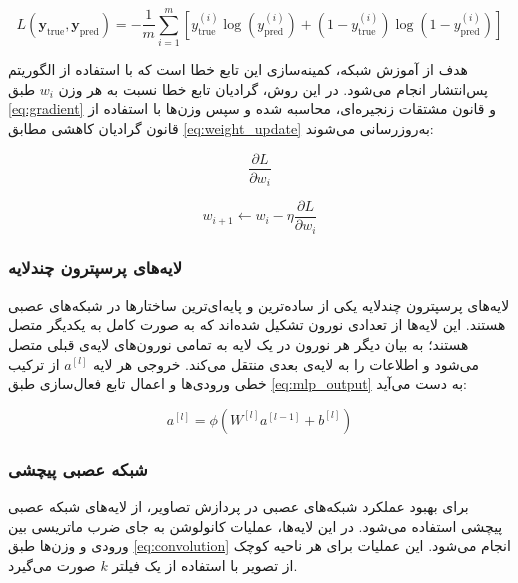 \begin{latin}
\begin{equation}
\label{eq:bce_loss}
L(\mathbf{y}_{\text{true}}, \mathbf{y}_{\text{pred}}) = -\frac{1}{m} \sum_{i=1}^{m} \left[ y_{\text{true}}^{(i)} \log(y_{\text{pred}}^{(i)}) + (1 - y_{\text{true}}^{(i)}) \log(1 - y_{\text{pred}}^{(i)}) \right]
\end{equation}
\end{latin}


هدف از آموزش شبکه، کمینه‌سازی این تابع خطا است که با استفاده از الگوریتم پس‌انتشار انجام می‌شود. در این روش، گرادیان
 تابع خطا نسبت به هر وزن \(w_i\) طبق \autoref{eq:gradient} و قانون مشتقات زنجیره‌ای، محاسبه شده و سپس وزن‌ها با استفاده از قانون گرادیان کاهشی مطابق \autoref{eq:weight_update} به‌روزرسانی می‌شوند:

\begin{latin}
\begin{equation}
\label{eq:gradient}
\frac{\partial L}{\partial w_i}
\end{equation}
\end{latin}

\begin{latin}
\begin{equation}
\label{eq:weight_update}
w_{i+1} \leftarrow w_i - \eta \frac{\partial L}{\partial w_i}
\end{equation}
\end{latin}

\subsubsection{لایه‌های پرسپترون
\protect{}
 چندلایه}
لایه‌های پرسپترون چندلایه
 یکی از ساده‌ترین و پایه‌ای‌ترین ساختارها در شبکه‌های عصبی هستند. این لایه‌ها از تعدادی نورون تشکیل شده‌اند که به صورت کامل به یکدیگر متصل هستند؛ به بیان دیگر هر نورون در یک لایه به تمامی نورون‌های لایه‌ی قبلی متصل می‌شود و اطلاعات را به لایه‌ی بعدی منتقل می‌کند. خروجی هر لایه \(a^{[l]}\) از ترکیب خطی ورودی‌ها و اعمال تابع فعال‌سازی طبق \autoref{eq:mlp_output} به دست می‌آید:

\begin{latin}
\begin{equation}
\label{eq:mlp_output}
a^{[l]} = \phi(W^{[l]} a^{[l-1]} + b^{[l]})
\end{equation}
\end{latin}

\subsubsection{شبکه عصبی پیچشی
\protect{}}
برای بهبود عملکرد شبکه‌های عصبی در پردازش تصاویر، از لایه‌های شبکه عصبی پیچشی
استفاده می‌شود. در این لایه‌ها، عملیات کانولوشن به جای ضرب ماتریسی بین ورودی و وزن‌ها طبق \autoref{eq:convolution} انجام می‌شود. این عملیات برای هر ناحیه کوچک از تصویر با استفاده از یک فیلتر \(k\) صورت می‌گیرد.

